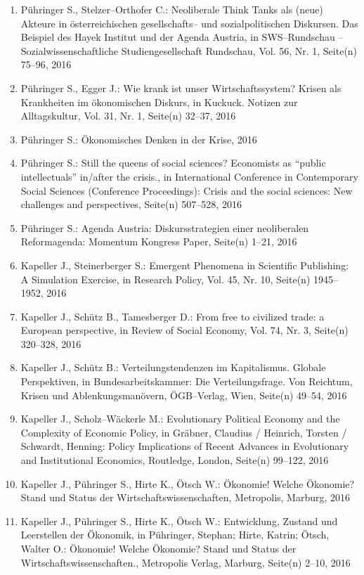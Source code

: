 \begin{enumerate}
	 \item Pühringer S., Stelzer--Orthofer C.: Neoliberale Think Tanks als (neue) Akteure in österreichischen gesellschafts-- und sozialpolitischen Diskursen. Das Beispiel des Hayek Institut und der Agenda Austria, in SWS--Rundschau -- Sozialwissenschaftliche Studiengesellschaft Rundschau, Vol. 56, Nr. 1, Seite(n) 75--96, 2016
	 \item Pühringer S., Egger J.: Wie krank ist unser Wirtschaftssystem? Krisen als Krankheiten im ökonomischen Diskurs, in Kuckuck. Notizen zur Alltagskultur, Vol. 31, Nr. 1, Seite(n) 32--37, 2016
	 \item Pühringer S.: Ökonomisches Denken in der Krise, 2016
	 \item Pühringer S.: Still the queens of social sciences? Economists as “public intellectuals” in/after the crisis., in International Conference in Contemporary Social Sciences (Conference Proceedings): Crisis and the social sciences: New challenges and perspectives, Seite(n) 507--528, 2016
	 \item Pühringer S.: Agenda Austria: Diskursstrategien einer neoliberalen Reformagenda: Momentum Kongress Paper, Seite(n) 1--21, 2016
	 \item Kapeller J., Steinerberger S.: Emergent Phenomena in Scientific Publishing: A Simulation Exercise, in Research Policy, Vol. 45, Nr. 10, Seite(n) 1945–1952, 2016
	 \item Kapeller J., Schütz B., Tamesberger D.: From free to civilized trade: a European perspective, in Review of Social Economy, Vol. 74, Nr. 3, Seite(n) 320--328, 2016
	 \item Kapeller J., Schütz B.: Verteilungstendenzen im Kapitalismus. Globale Perspektiven, in Bundesarbeitskammer: Die Verteilungsfrage. Von Reichtum, Krisen und Ablenkungsmanövern, ÖGB--Verlag, Wien, Seite(n) 49--54, 2016
	 \item Kapeller J., Scholz--Wäckerle M.: Evolutionary Political Economy and the Complexity of Economic Policy, in Gräbner,  Claudius / Heinrich, Torsten / Schwardt, Henning: Policy  Implications of Recent Advances in Evolutionary and Institutional  Economics, Routledge, London, Seite(n) 99--122, 2016
	 \item Kapeller J., Pühringer S., Hirte K., Ötsch W.: Ökonomie! Welche Ökonomie? Stand und Status der Wirtschaftswissenschaften, Metropolis, Marburg, 2016
	 \item Kapeller J., Pühringer S., Hirte K., Ötsch W.: Entwicklung, Zustand und Leerstellen der Ökonomik, in Pühringer, Stephan; Hirte, Katrin; Ötsch, Walter O.: Ökonomie! Welche Ökonomie? Stand und Status der Wirtschaftswissenschaften., Metropolis Verlag, Marburg, Seite(n) 2--10, 2016

\end{enumerate}
